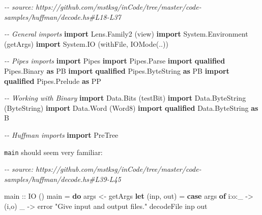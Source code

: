 \documentclass[]{article}
\newenvironment{Shaded}{}{}
\newcommand{\CommentTok}[1]{\textcolor[rgb]{0.38,0.63,0.69}{\textit{#1}}}
\newcommand{\DataTypeTok}[1]{\textcolor[rgb]{0.56,0.13,0.00}{#1}}
\newcommand{\FunctionTok}[1]{\textcolor[rgb]{0.02,0.16,0.49}{#1}}
\newcommand{\KeywordTok}[1]{\textcolor[rgb]{0.00,0.44,0.13}{\textbf{#1}}}
\newcommand{\NormalTok}[1]{#1}
\newcommand{\OperatorTok}[1]{\textcolor[rgb]{0.40,0.40,0.40}{#1}}
\newcommand{\OtherTok}[1]{\textcolor[rgb]{0.00,0.44,0.13}{#1}}
\newcommand{\StringTok}[1]{\textcolor[rgb]{0.25,0.44,0.63}{#1}}
\begin{document}
\begin{Shaded}
\begin{Highlighting}[]
\CommentTok{{-}{-} source: https://github.com/mstksg/inCode/tree/master/code{-}samples/huffman/decode.hs\#L18{-}L37}

\CommentTok{{-}{-} General imports}
\KeywordTok{import} \DataTypeTok{Lens.Family2}\NormalTok{       (view)}
\KeywordTok{import} \DataTypeTok{System.Environment}\NormalTok{ (getArgs)}
\KeywordTok{import} \DataTypeTok{System.IO}\NormalTok{          (withFile, }\DataTypeTok{IOMode}\NormalTok{(..))}

\CommentTok{{-}{-} Pipes imports}
\KeywordTok{import} \DataTypeTok{Pipes}
\KeywordTok{import} \DataTypeTok{Pipes.Parse}
\KeywordTok{import} \KeywordTok{qualified} \DataTypeTok{Pipes.Binary}     \KeywordTok{as} \DataTypeTok{PB}
\KeywordTok{import} \KeywordTok{qualified} \DataTypeTok{Pipes.ByteString} \KeywordTok{as} \DataTypeTok{PB}
\KeywordTok{import} \KeywordTok{qualified} \DataTypeTok{Pipes.Prelude}    \KeywordTok{as} \DataTypeTok{PP}

\CommentTok{{-}{-} Working with Binary}
\KeywordTok{import} \DataTypeTok{Data.Bits}\NormalTok{                 (testBit)}
\KeywordTok{import} \DataTypeTok{Data.ByteString}\NormalTok{           (}\DataTypeTok{ByteString}\NormalTok{)}
\KeywordTok{import} \DataTypeTok{Data.Word}\NormalTok{                 (}\DataTypeTok{Word8}\NormalTok{)}
\KeywordTok{import} \KeywordTok{qualified} \DataTypeTok{Data.ByteString} \KeywordTok{as} \DataTypeTok{B}

\CommentTok{{-}{-} Huffman imports}
\KeywordTok{import} \DataTypeTok{PreTree}
\end{Highlighting}
\end{Shaded}

\texttt{main} should seem very familiar:

\begin{Shaded}
\begin{Highlighting}[]
\CommentTok{{-}{-} source: https://github.com/mstksg/inCode/tree/master/code{-}samples/huffman/decode.hs\#L39{-}L45}

\OtherTok{main ::} \DataTypeTok{IO}\NormalTok{ ()}
\NormalTok{main }\OtherTok{=} \KeywordTok{do}
\NormalTok{    args     }\OtherTok{<{-}}\NormalTok{ getArgs}
    \KeywordTok{let}\NormalTok{ (inp, out)  }\OtherTok{=} \KeywordTok{case}\NormalTok{ args }\KeywordTok{of}
\NormalTok{                        i}\OperatorTok{:}\NormalTok{o}\OperatorTok{:}\NormalTok{\_      }\OtherTok{{-}>}\NormalTok{ (i,o)}
\NormalTok{                        \_          }\OtherTok{{-}>} \FunctionTok{error} \StringTok{"Give input and output files."}
\NormalTok{    decodeFile inp out}
\end{Highlighting}
\end{Shaded}
\end{document}

